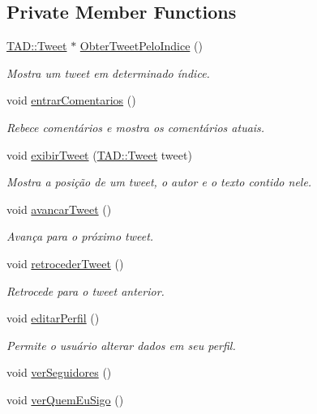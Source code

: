 \subsection*{Private Member Functions}
\begin{DoxyCompactItemize}
\item 
\hyperlink{class_t_a_d_1_1_tweet}{T\+A\+D\+::\+Tweet} $\ast$ \hyperlink{class_interface_1_1_perfil_a93159741b49f91350a065313fc0fede1}{Obter\+Tweet\+Pelo\+Indice} ()
\begin{DoxyCompactList}\small\item\em Mostra um tweet em determinado índice. \end{DoxyCompactList}\item 
void \hyperlink{class_interface_1_1_perfil_a7e82dfc70e3f87a22f57d116f7f50710}{entrar\+Comentarios} ()
\begin{DoxyCompactList}\small\item\em Rebece comentários e mostra os comentários atuais. \end{DoxyCompactList}\item 
void \hyperlink{class_interface_1_1_perfil_af925753b09f7c38e8290af6e827ab9c4}{exibir\+Tweet} (\hyperlink{class_t_a_d_1_1_tweet}{T\+A\+D\+::\+Tweet} tweet)
\begin{DoxyCompactList}\small\item\em Mostra a posição de um tweet, o autor e o texto contido nele. \end{DoxyCompactList}\item 
void \hyperlink{class_interface_1_1_perfil_abbe830155fca2f3fd21d2c3c6d3bcb84}{avancar\+Tweet} ()
\begin{DoxyCompactList}\small\item\em Avança para o próximo tweet. \end{DoxyCompactList}\item 
void \hyperlink{class_interface_1_1_perfil_aa7e1fbff4eb1c95c13f91b3a0ec84a42}{retroceder\+Tweet} ()
\begin{DoxyCompactList}\small\item\em Retrocede para o tweet anterior. \end{DoxyCompactList}\item 
void \hyperlink{class_interface_1_1_perfil_a369818e6dfa425abf7d960c5b8e901b7}{editar\+Perfil} ()
\begin{DoxyCompactList}\small\item\em Permite o usuário alterar dados em seu perfil. \end{DoxyCompactList}\item 
void \hyperlink{class_interface_1_1_perfil_af092dafc212ec6b5e4fe4e0438c58128}{ver\+Seguidores} ()
\item 
void \hyperlink{class_interface_1_1_perfil_aec80bf547cd3ee77582061f1f18ca1ca}{ver\+Quem\+Eu\+Sigo} ()
\end{DoxyCompactItemize}
